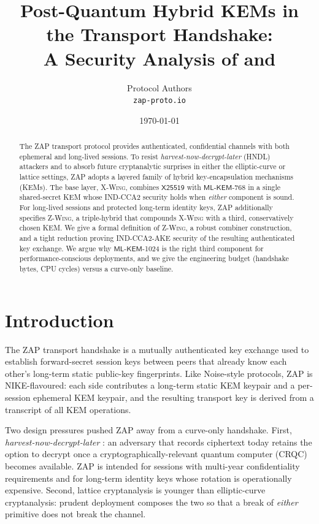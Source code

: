 \documentclass[11pt,a4paper]{article}
\title{Post-Quantum Hybrid KEMs in the \zap{} Transport Handshake:\\
A Security Analysis of \xwing{} and \zwing{}}
\author{\zap{} Protocol Authors\\\texttt{zap-proto.io}}
\date{\today}
\theoremstyle{definition}
\theoremstyle{remark}
\newcommand{\xwing}{\textsc{X-Wing}}
\newcommand{\zwing}{\textsc{Z-Wing}}
\newcommand{\zap}{\textsc{ZAP}}
\newcommand{\mlkem}{\ensuremath{\mathsf{ML\text{-}KEM}}}
\newcommand{\xtf}{\ensuremath{\mathsf{X25519}}}
\begin{document}
\maketitle

\begin{abstract}
The \zap{} transport protocol provides authenticated, confidential channels with
both ephemeral and long-lived sessions. To resist \emph{harvest-now-decrypt-later}
(HNDL) attackers and to absorb future cryptanalytic surprises in either the
elliptic-curve or lattice settings, \zap{} adopts a layered family of hybrid
key-encapsulation mechanisms (KEMs). The base layer, \xwing{}, combines
\xtf{} with \mlkem{}-768 in a single shared-secret KEM whose IND-CCA2
security holds when \emph{either} component is sound. For long-lived sessions
and protected long-term identity keys, \zap{} additionally specifies \zwing{},
a triple-hybrid that compounds \xwing{} with a third, conservatively chosen
KEM. We give a formal definition of \zwing{}, a robust combiner construction,
and a tight reduction proving IND-CCA2-AKE security of the resulting
authenticated key exchange. We argue why \mlkem{}-1024 is the right third
component for performance-conscious deployments, and we give the engineering
budget (handshake bytes, CPU cycles) versus a curve-only baseline.
\end{abstract}

\section{Introduction}\label{sec:intro}

The \zap{} transport handshake is a mutually authenticated key exchange used to
establish forward-secret session keys between peers that already know each
other's long-term static public-key fingerprints. Like Noise-style protocols,
\zap{} is NIKE-flavoured: each side contributes a long-term static KEM
keypair and a per-session ephemeral KEM keypair, and the resulting transport
key is derived from a transcript of all KEM operations.

Two design pressures pushed \zap{} away from a curve-only handshake.
First, \emph{harvest-now-decrypt-later} \cite{harvest_now}: an adversary that
records ciphertext today retains the option to decrypt once a
cryptographically-relevant quantum computer (CRQC) becomes available. \zap{}
is intended for sessions with multi-year confidentiality requirements and
for long-term identity keys whose rotation is operationally expensive.
Second, lattice cryptanalysis is younger than elliptic-curve cryptanalysis:
prudent deployment composes the two so that a break of \emph{either} primitive
does not break the channel.
\end{document}
